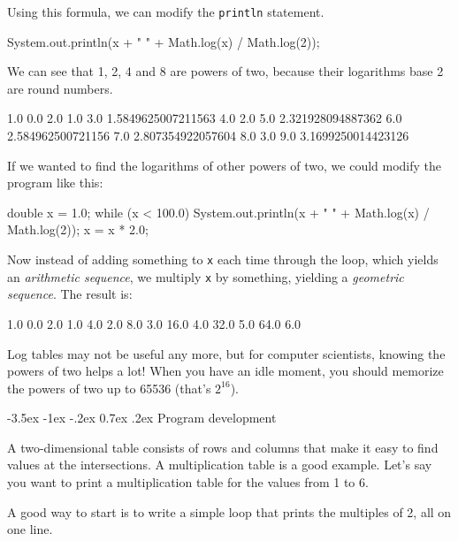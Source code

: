 \documentclass[12pt]{book}
\makeatletter
\renewcommand{\section}{\@startsection {section}{1}{\z@}%
    {-3.5ex \@plus -1ex \@minus -.2ex}%
    {0.7ex \@plus.2ex}%
    {\normalfont\Large\bfseries}}
\theoremstyle{exercise}
\makeatother
\begin{document}
Using this formula, we can modify the {\tt println} statement.

\begin{code}
    System.out.println(x + "   " + Math.log(x) / Math.log(2));
\end{code}

We can see that 1, 2, 4 and 8 are powers of two, because their logarithms base 2 are round numbers.

\begin{stdout}
1.0   0.0
2.0   1.0
3.0   1.5849625007211563
4.0   2.0
5.0   2.321928094887362
6.0   2.584962500721156
7.0   2.807354922057604
8.0   3.0
9.0   3.1699250014423126
\end{stdout}

If we wanted to find the logarithms of other powers of two, we could modify the program like this:

\begin{code}
    double x = 1.0;
    while (x < 100.0) {
        System.out.println(x + "   " + Math.log(x) / Math.log(2));
        x = x * 2.0;
    }
\end{code}

Now instead of adding something to {\tt x} each time through the loop, which yields an {\em arithmetic sequence}, we multiply {\tt x} by something, yielding a {\em geometric sequence}.
The result is:

\begin{stdout}
1.0   0.0
2.0   1.0
4.0   2.0
8.0   3.0
16.0   4.0
32.0   5.0
64.0   6.0
\end{stdout}

Log tables may not be useful any more, but for computer scientists, knowing the powers of two helps a lot!
When you have an idle moment, you should memorize the powers of two up to 65536 (that's $2^{16}$).


\section{Program development}
\label{encapsulation}


A two-dimensional table consists of rows and columns that make it easy to find values at the intersections.
A multiplication table is a good example.
Let's say you want to print a multiplication table for the values from 1 to 6.

A good way to start is to write a simple loop that prints the multiples of 2, all on one line.
\end{document}
